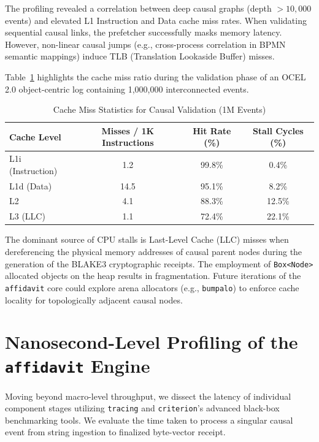 The profiling revealed a correlation between deep causal graphs (depth $> 10,000$ events) and elevated L1 Instruction and Data cache miss rates. When validating sequential causal links, the prefetcher successfully masks memory latency. However, non-linear causal jumps (e.g., cross-process correlation in BPMN semantic mappings) induce TLB (Translation Lookaside Buffer) misses.

Table~\ref{tab:cache_misses} highlights the cache miss ratio during the validation phase of an OCEL 2.0 object-centric log containing 1,000,000 interconnected events.

\begin{table}[htbp]
\centering
\caption{Cache Miss Statistics for Causal Validation (1M Events)}
\label{tab:cache_misses}
\begin{tabular}{@{}lccc@{}}
\toprule
\textbf{Cache Level} & \textbf{Misses / 1K Instructions} & \textbf{Hit Rate (\%)} & \textbf{Stall Cycles (\%)} \\ \midrule
L1i (Instruction) & 1.2 & 99.8\% & 0.4\% \\
L1d (Data) & 14.5 & 95.1\% & 8.2\% \\
L2 & 4.1 & 88.3\% & 12.5\% \\
L3 (LLC) & 1.1 & 72.4\% & 22.1\% \\ \bottomrule
\end{tabular}
\end{table}

The dominant source of CPU stalls is Last-Level Cache (LLC) misses when dereferencing the physical memory addresses of causal parent nodes during the generation of the BLAKE3 cryptographic receipts. The employment of \texttt{Box<Node>} allocated objects on the heap results in fragmentation. Future iterations of the \texttt{affidavit} core could explore arena allocators (e.g., \texttt{bumpalo}) to enforce cache locality for topologically adjacent causal nodes.

\section{Nanosecond-Level Profiling of the \texttt{affidavit} Engine}
\label{sec:eval_nanosecond}

Moving beyond macro-level throughput, we dissect the latency of individual component stages utilizing \texttt{tracing} and \texttt{criterion}'s advanced black-box benchmarking tools. We evaluate the time taken to process a singular causal event from string ingestion to finalized byte-vector receipt.


